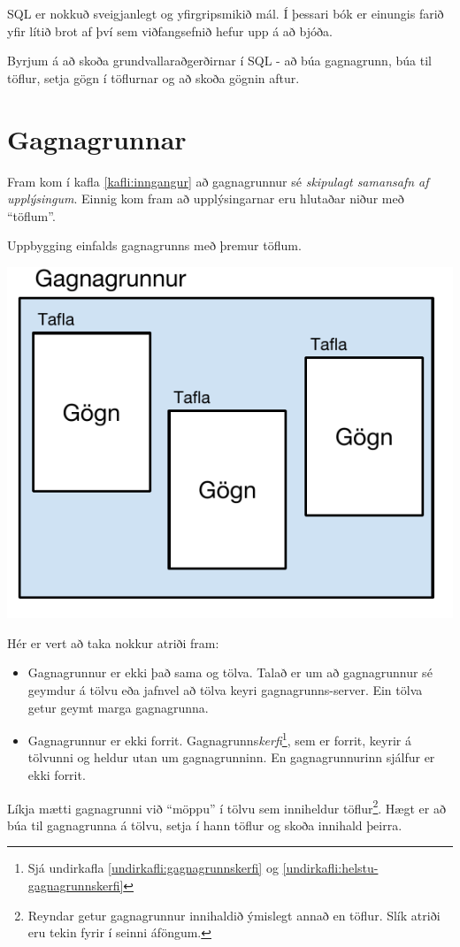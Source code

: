 SQL er nokkuð sveigjanlegt og yfirgripsmikið mál. 
Í þessari bók er einungis farið yfir lítið brot af því sem viðfangsefnið hefur upp á að bjóða.

Byrjum á að skoða grundvallaraðgerðirnar í SQL - að búa gagnagrunn, búa til töflur, setja gögn í töflurnar og að skoða gögnin aftur.
\section{Gagnagrunnar}
Fram kom í kafla \ref{kafli:inngangur} að gagnagrunnur sé \emph{skipulagt samansafn af upplýsingum}. Einnig kom fram að upplýsingarnar eru hlutaðar niður með ``töflum''.
\begin{marginfigure}
\caption[Uppbygging gagnagrunns]{Uppbygging einfalds gagnagrunns með þremur töflum.}
\label{mynd:uppbygging-gagnagrunns}
\centering
\includegraphics[width=\linewidth]{myndir/uppbygging-gagnagrunns}
\end{marginfigure}
Hér er vert að taka nokkur atriði fram:
\begin{itemize}
 \item Gagnagrunnur er ekki það sama og tölva. Talað er um að gagnagrunnur sé geymdur á tölvu eða jafnvel að tölva keyri gagnagrunns-server. Ein tölva getur geymt marga gagnagrunna.
 \item Gagnagrunnur er ekki forrit. Gagnagrunns\emph{kerfi}\footnote{Sjá undirkafla \ref{undirkafli:gagnagrunnskerfi} og \ref{undirkafli:helstu-gagnagrunnskerfi}}, sem er forrit, keyrir á tölvunni og heldur utan um gagnagrunninn. En gagnagrunnurinn sjálfur er ekki forrit.
\end{itemize}
Líkja mætti gagnagrunni við ``möppu'' í tölvu sem inniheldur töflur\footnote{Reyndar getur gagnagrunnur innihaldið ýmislegt annað en töflur. Slík atriði eru tekin fyrir í seinni áföngum.}. Hægt er að búa til gagnagrunna á tölvu, setja í hann töflur og skoða innihald þeirra.

